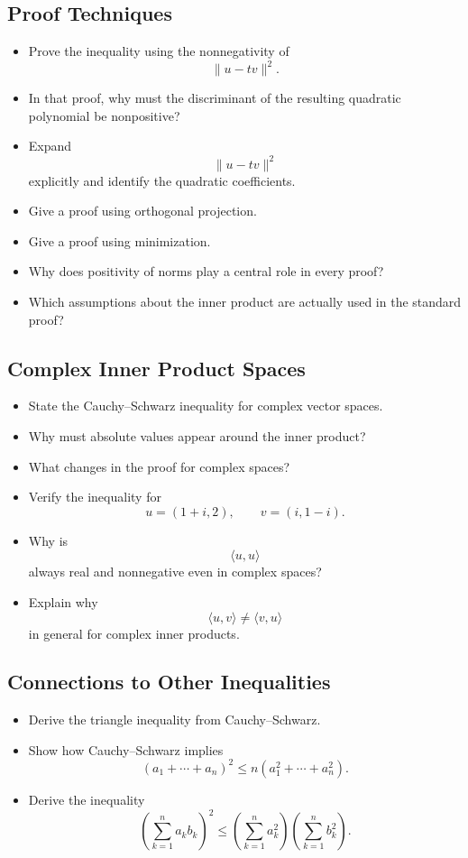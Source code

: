 \subsection{Proof Techniques}

\begin{itemize}[resume]
  \item Prove the inequality using the nonnegativity of
    \[ \|u-tv\|^{2}. \]
  \item In that proof, why must the discriminant of the resulting quadratic polynomial be nonpositive?
  \item Expand
    \[ \|u-tv\|^{2} \]
    explicitly and identify the quadratic coefficients.
  \item Give a proof using orthogonal projection.
  \item Give a proof using minimization.
  \item Why does positivity of norms play a central role in every proof?
  \item Which assumptions about the inner product are actually used in the standard proof?
\end{itemize}

\subsection{Complex Inner Product Spaces}

\begin{itemize}[resume]
  \item State the Cauchy--Schwarz inequality for complex vector spaces.
  \item Why must absolute values appear around the inner product?
  \item What changes in the proof for complex spaces?
  \item Verify the inequality for
    \[ u=(1+i,2), \qquad v=(i,1-i). \]
  \item Why is
    \[ \langle u,u\rangle \]
    always real and nonnegative even in complex spaces?
  \item Explain why
    \[ \langle u,v\rangle \neq \langle v,u\rangle \]
    in general for complex inner products.
\end{itemize}

\subsection{Connections to Other Inequalities}

\begin{itemize}[resume]
  \item Derive the triangle inequality from Cauchy--Schwarz.
  \item Show how Cauchy--Schwarz implies
    \[ (a_{1}+\cdots+a_{n})^{2} \le n(a_{1}^{2}+\cdots+a_{n}^{2}). \]
  \item Derive the inequality
    \[ \left(\sum_{k=1}^{n} a_{k} b_{k}\right)^{2} \le \left(\sum_{k=1}^{n} a_{k}^{2}\right) \left(\sum_{k=1}^{n} b_{k}^{2}\right). \]
\end{itemize}

